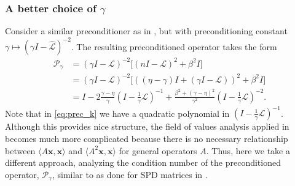 \documentclass[review]{siamart}
\begin{document}
\subsubsection{A better choice of $\gamma$}\label{sec:solve:prec:gamma}

Consider a similar preconditioner as in
, but with preconditioning constant $\gamma \mapsto
(\gamma I - \widehat{\mathcal{L}})^{-2}$. The resulting preconditioned
operator takes the form
%
\begin{align}\nonumber
\mathcal{P}_\gamma & =
(\gamma I - \mathcal{L})^{-2}\Big[(nI - \mathcal{L})^2 + \beta^2 I\Big] \\ \nonumber
& = (\gamma I - \mathcal{L})^{-2}\Big[((\eta-\gamma)I + (\gamma I - \mathcal{L}))^2 + \beta^2 I\Big] \\
& = I - 2\frac{\gamma-\eta}{\gamma}\left(I - \tfrac{1}{\gamma}\mathcal{L}\right)^{-1} +
	\frac{\beta^2 + (\gamma-\eta)^2}{\gamma^2}
	\left(I - \tfrac{1}{\gamma}\mathcal{L}\right)^{-2}.\label{eq:prec_k}
\end{align}
%
Note that in \eqref{eq:prec_k} we have a quadratic polynomial in
$(I - \tfrac{1}{\gamma}\mathcal{L})^{-1}$. Although this provides
nice structure, the field of values analysis applied in 
becomes much more complicated because there is no necessary relationship between
$\langle A\mathbf{x},\mathbf{x}\rangle$ and
$\langle A^2\mathbf{x},\mathbf{x}\rangle$ for general operators $A$. Thus, here
we take a different approach, analyzing the condition number of the preconditioned
operator, $\mathcal{P}_\gamma$, similar to as done for SPD matrices in \cite{exh}.

\end{document}
